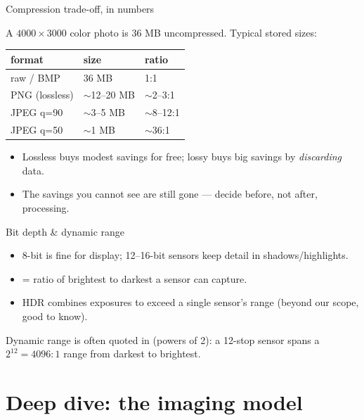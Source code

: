 \documentclass[10pt,aspectratio=169]{beamer}
\begin{document}
\begin{frame}{Compression trade-off, in numbers}
  \begin{mathbox}
    A $4000\times3000$ color photo is \(36\) MB uncompressed. Typical stored sizes: \\[3pt]
    \begin{tabular}{@{}lll@{}}
      \toprule
      format & size & ratio \\
      \midrule
      raw / BMP & 36 MB   & 1:1 \\
      PNG (lossless) & \(\sim\)12--20 MB & \(\sim\)2--3:1 \\
      JPEG q=90 & \(\sim\)3--5 MB & \(\sim\)8--12:1 \\
      JPEG q=50 & \(\sim\)1 MB & \(\sim\)36:1 \\
      \bottomrule
    \end{tabular}
  \end{mathbox}
  \begin{itemize}
    \item Lossless buys modest savings for free; lossy buys big savings by \emph{discarding} data.
    \item The savings you cannot see are still gone — decide before, not after, processing.
  \end{itemize}
\end{frame}

\begin{frame}{Bit depth \& dynamic range}
  \begin{itemize}
    \item 8-bit is fine for display; 12--16-bit sensors keep detail in shadows/highlights.
    \item {} = ratio of brightest to darkest a sensor can capture.
    \item HDR combines exposures to exceed a single sensor's range (beyond our scope, good to know).
  \end{itemize}
  \begin{infobox}
    Dynamic range is often quoted in  (powers of 2): a 12-stop sensor spans a
    \(2^{12} = 4096{:}1\) range from darkest to brightest.
  \end{infobox}
\end{frame}

\section{Deep dive: the imaging model}
\end{document}
